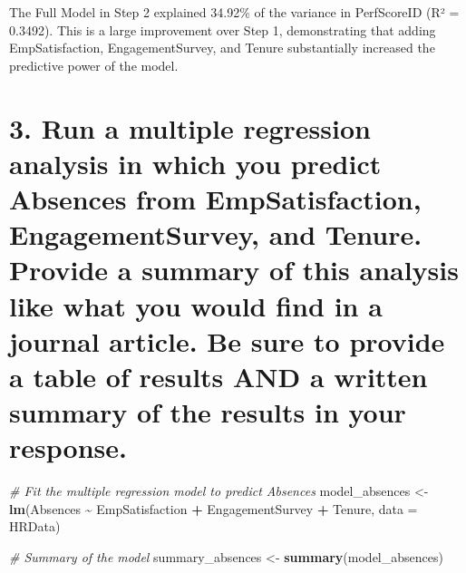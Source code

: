 \documentclass[
]{article}
\newenvironment{Shaded}{\begin{snugshade}}{\end{snugshade}}
\newcommand{\AttributeTok}[1]{\textcolor[rgb]{0.13,0.29,0.53}{#1}}
\newcommand{\CommentTok}[1]{\textcolor[rgb]{0.56,0.35,0.01}{\textit{#1}}}
\newcommand{\FunctionTok}[1]{\textcolor[rgb]{0.13,0.29,0.53}{\textbf{#1}}}
\newcommand{\NormalTok}[1]{#1}
\newcommand{\OtherTok}[1]{\textcolor[rgb]{0.56,0.35,0.01}{#1}}
\newcommand{\SpecialCharTok}[1]{\textcolor[rgb]{0.81,0.36,0.00}{\textbf{#1}}}
\newcommand{\StringTok}[1]{\textcolor[rgb]{0.31,0.60,0.02}{#1}}
\begin{document}
The Full Model in Step 2 explained 34.92\% of the variance in
PerfScoreID (R² = 0.3492). This is a large improvement over Step 1,
demonstrating that adding EmpSatisfaction, EngagementSurvey, and Tenure
substantially increased the predictive power of the model.

\section{3. Run a multiple regression analysis in which you predict
Absences from EmpSatisfaction, EngagementSurvey, and Tenure. Provide a
summary of this analysis like what you would find in a journal article.
Be sure to provide a table of results AND a written summary of the
results in your
response.}\label{run-a-multiple-regression-analysis-in-which-you-predict-absences-from-empsatisfaction-engagementsurvey-and-tenure.-provide-a-summary-of-this-analysis-like-what-you-would-find-in-a-journal-article.-be-sure-to-provide-a-table-of-results-and-a-written-summary-of-the-results-in-your-response.}

\begin{Shaded}
\begin{Highlighting}[]
\CommentTok{\# Fit the multiple regression model to predict Absences}
\NormalTok{model\_absences }\OtherTok{\textless{}{-}} \FunctionTok{lm}\NormalTok{(Absences }\SpecialCharTok{\textasciitilde{}}\NormalTok{ EmpSatisfaction }\SpecialCharTok{+}\NormalTok{ EngagementSurvey }\SpecialCharTok{+}\NormalTok{ Tenure, }\AttributeTok{data =}\NormalTok{ HRData)}

\CommentTok{\# Summary of the model}
\NormalTok{summary\_absences }\OtherTok{\textless{}{-}} \FunctionTok{summary}\NormalTok{(model\_absences)}
\end{Highlighting}
\end{Shaded}

\begin{Shaded}
\end{Shaded}
\end{document}
